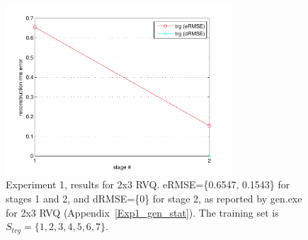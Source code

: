 							\begin{figure}
							\centering
							\includegraphics[width=0.75\textwidth]{thesis2/RVQ_8x3_trg_1_to_7.pdf}
							\caption{Experiment 1, results for 2x3 RVQ.  eRMSE=\{0.6547, 0.1543\} for stages 1 and 2, and dRMSE=\{0\} for stage 2, as reported by gen.exe for 2x3 RVQ (Appendix~\ref{Exp1_gen_stat}).  The training set is $S_{trg}=\{1,2,3,4,5,6,7\}$.}
							\label{fig:RVQ_8x3_trg_1_to_7}
							\end{figure}


